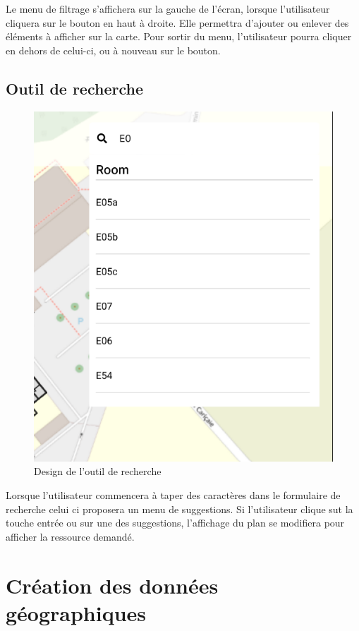 \documentclass[
    iai, %
    il, %
]{heig-tb}
\begin{document}
Le menu de filtrage s'affichera sur la gauche de l'écran, lorsque l'utilisateur cliquera sur le bouton en haut à droite.
Elle permettra d'ajouter ou enlever des éléments à afficher sur la carte.
Pour sortir du menu, l'utilisateur pourra cliquer en dehors de celui-ci, ou à nouveau sur le bouton.

\section{Outil de recherche}

\begin{figure}[H]
    \caption{Design de l'outil de recherche}
    \centering
    \includegraphics[scale=0.5]{designRecherche.png}
\end{figure}

Lorsque l'utilisateur commencera à taper des caractères dans le formulaire de recherche celui ci proposera un menu de suggestions.
Si l'utilisateur clique sut la touche entrée ou sur une des suggestions, l'affichage du plan se modifiera pour afficher la ressource demandé.

\chapter{Création des données géographiques}
\end{document}
